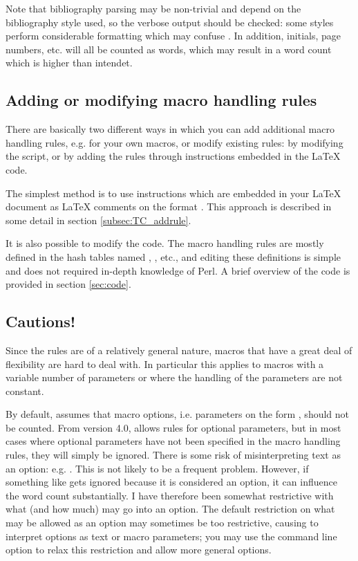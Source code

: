 \documentclass{article}
\begin{document}
Note that bibliography parsing may be non-trivial and depend on the bibliography style used, so the verbose output should be checked: some styles perform considerable formatting which may confuse \TeXcount{}. In addition, initials, page numbers, etc. will all be counted as words, which may result in a word count which is higher than intendet.


\subsection{Adding or modifying macro handling rules}

There are basically two different ways in which you can add additional macro handling rules, e.g. for your own macros, or modify existing rules: by modifying the \TeXcount{} script, or by adding the rules through \TeXcount{} instructions embedded in the \LaTeX{} code.

The simplest method is to use \TeXcount{} instructions which are embedded in your \LaTeX{} document as \LaTeX{} comments on the format . This approach is described in some detail in section \ref{subsec:TC_addrule}.

It is also possible to modify the \TeXcount{} code. The macro handling rules are mostly defined in the hash tables named , , etc., and editing these definitions is simple and does not required in-depth knowledge of Perl. A brief overview of the \TeXcount{} code is provided in section \ref{sec:code}. 


\subsection{Cautions!}

Since the rules are of a relatively general nature, macros that have a great deal of flexibility are hard to deal with. In particular this applies to macros with a variable number of parameters or where the handling of the parameters are not constant.

By default, \TeXcount{} assumes that macro options, i.e. parameters on the form \code{[\ldots]}, should not be counted. From version 4.0, \TeXcount{} allows rules for optional parameters, but in most cases where optional parameters have not been specified in the macro handling rules, they will simply be ignored. There is some risk of misinterpreting text as an option: e.g. . This is not likely to be a frequent problem. However, if something like  gets ignored because it is considered an option, it can influence the word count substantially. I have therefore been somewhat restrictive with what (and how much) may go into an option. The default restriction on what may be allowed as an option may sometimes be too restrictive, causing \TeXcount{} to interpret options as text or macro parameters; you may use the command line option  to relax this restriction and allow more general options.
\end{document}
